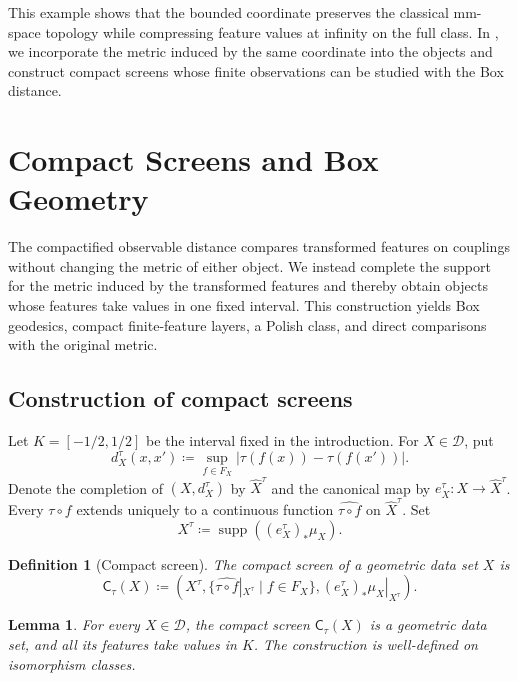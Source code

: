 \documentclass[10pt,a4paper]{amsart}
\newtheorem{lemma}[theorem]{Lemma}
\newtheorem{definition}[theorem]{Definition}
\newcommand{\D}{\mathcal D}
\DeclareMathOperator{\supp}{supp}
\begin{document}
This example shows that the bounded coordinate preserves the classical mm-space topology while compressing feature values at infinity on the full class. In , we incorporate the metric induced by the same coordinate into the objects and construct compact screens whose finite observations can be studied with the Box distance.

\section{Compact Screens and Box Geometry}
\label{sec:compact-screen-box}

The compactified observable distance compares transformed features on couplings without changing the metric of either object. We instead complete the support for the metric induced by the transformed features and thereby obtain objects whose features take values in one fixed interval. This construction yields Box geodesics, compact finite-feature layers, a Polish class, and direct comparisons with the original metric.

\subsection{Construction of compact screens}
\label{subsec:compact-screen-construction}

Let $K=[-1/2,1/2]$ be the interval fixed in the introduction. For $X\in\D$, put
\[
d_X^\tau(x,x')\coloneqq
\sup_{f\in F_X}|\tau(f(x))-\tau(f(x'))|.
\]
Denote the completion of $(X,d_X^\tau)$ by $\widehat X^\tau$ and the canonical map by $e_X^\tau\colon X\to\widehat X^\tau$. Every $\tau\circ f$ extends uniquely to a continuous function $\widehat{\tau\circ f}$ on $\widehat X^\tau$. Set
\[
X^\tau\coloneqq\supp((e_X^\tau)_*\mu_X).
\]

\begin{definition}[Compact screen]
\label{def:compact-screen}
The compact screen of a geometric data set $X$ is
\[
\mathsf C_\tau(X)\coloneqq
\left(
X^\tau,
\{\widehat{\tau\circ f}|_{X^\tau}\mid f\in F_X\},
(e_X^\tau)_*\mu_X|_{X^\tau}
\right).
\]
\end{definition}

\begin{lemma}
\label{lem:compact-screen-gds}
For every $X\in\D$, the compact screen $\mathsf C_\tau(X)$ is a geometric data set, and all its features take values in $K$. The construction is well-defined on isomorphism classes.
\end{lemma}
\end{document}
